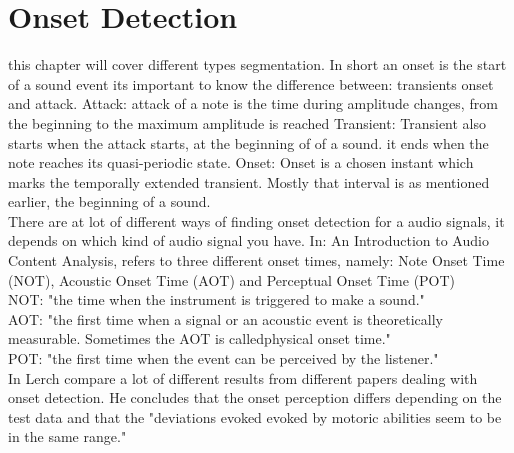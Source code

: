 \section{Onset Detection}
this chapter  will cover different types segmentation.
In short an onset is the start of a sound event \citep{ACA} 
its important to know the difference between: transients onset and attack. 
Attack: attack of a note is the time during amplitude changes, from the beginning to the maximum amplitude is reached \citep{ACA}
Transient: Transient also starts when the attack starts, at the beginning of of a sound. it ends when the note reaches its quasi-periodic state. \citep{ACA}
Onset: Onset is a chosen instant which marks the temporally extended transient. \citep{Bello2005} Mostly that interval is as mentioned earlier, the beginning of a sound. 
\\
There are at lot of different ways of  finding onset detection for a audio signals, it depends on which kind of audio signal you have.
In: An Introduction to Audio Content Analysis, \citep{ACA} refers to three different onset times, namely: Note Onset Time (NOT), Acoustic Onset Time (AOT) and Perceptual Onset Time (POT) 
\\
NOT: "the time when the instrument is triggered to make a sound." \citep{ACA}
\\
AOT: "the first time when a signal or an acoustic event is theoretically measurable. Sometimes the AOT is calledphysical onset time." \citep{ACA}
\\
POT: "the first time when the event can be perceived by the
listener." \citep{ACA}
\\
In \citep{ACA} Lerch compare a lot of different results from different papers dealing with onset detection. He concludes that the onset perception differs depending on the test data and that the "deviations evoked evoked by motoric abilities seem to be in the same range." \citep{ACA}
\\
